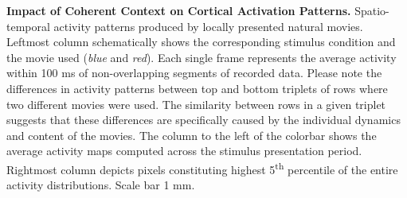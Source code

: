 \textbf{Impact of Coherent Context on Cortical Activation Patterns.}
Spatio-temporal activity patterns produced by locally presented natural
movies. Leftmost column schematically shows the corresponding stimulus
condition and the movie used (\textit{blue} and \textit{red}). Each single frame represents
the average activity within 100 ms of non-overlapping segments of recorded
data. Please note the differences in activity patterns between top and
bottom triplets of rows where two different movies were used. The
similarity between rows in a given triplet suggests that these differences
are specifically caused by the individual dynamics and content of the
movies. The column to the left of the colorbar shows the average activity
maps computed across the stimulus presentation period. Rightmost column
depicts pixels constituting highest 5\textsuperscript{th} percentile of the
entire activity distributions. Scale bar 1 mm.
